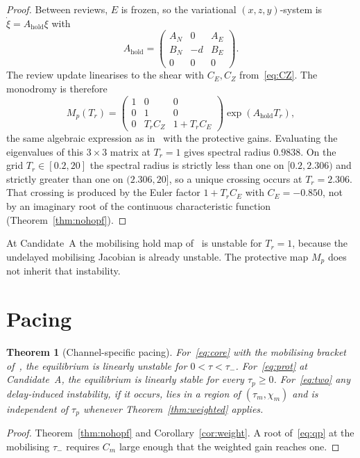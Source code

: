 \documentclass[11pt]{article}
\newtheorem{theorem}{Theorem}
\theoremstyle{definition}
\begin{document}
\begin{proof}
Between reviews, $E$ is frozen, so the variational $(x,z,y)$-system is $\dot\xi=A_{\mathrm{hold}}\xi$ with
\[
A_{\mathrm{hold}}=\begin{pmatrix}A_N&0&A_E\\ B_N&-d&B_E\\ 0&0&0\end{pmatrix}.
\]
The review update linearises to the shear with $C_E,C_Z$ from~\eqref{eq:CZ}. The monodromy is therefore
\[
M_p(T_r)=\begin{pmatrix}1&0&0\\0&1&0\\0&T_r C_Z&1+T_r C_E\end{pmatrix}\exp(A_{\mathrm{hold}}T_r),
\]
the same algebraic expression as in~\cite{paperI} with the protective gains. Evaluating the eigenvalues of this $3\times 3$ matrix at $T_r=1$ gives spectral radius $0.9838$. On the grid $T_r\in[0.2,20]$ the spectral radius is strictly less than one on $[0.2,2.306)$ and strictly greater than one on $(2.306,20]$, so a unique crossing occurs at $T_r=2.306$. That crossing is produced by the Euler factor $1+T_r C_E$ with $C_E=-0.850$, not by an imaginary root of the continuous characteristic function (Theorem~\ref{thm:nohopf}).
\end{proof}

At Candidate~A the mobilising hold map of~\cite{paperI} is unstable for $T_r=1$, because the undelayed mobilising Jacobian is already unstable. The protective map $M_p$ does not inherit that instability.

\section{Pacing}

\begin{theorem}[Channel-specific pacing]
\label{thm:policy}
For~\eqref{eq:core} with the mobilising bracket of~\cite{paperI}, the equilibrium is linearly unstable for $0<\tau<\tau_-$. For~\eqref{eq:prot} at Candidate~A, the equilibrium is linearly stable for every $\tau_p\ge 0$. For~\eqref{eq:two} any delay-induced instability, if it occurs, lies in a region of $(\tau_m,\chi_m)$ and is independent of $\tau_p$ whenever Theorem~\ref{thm:weighted} applies.
\end{theorem}

\begin{proof}
Theorem~\ref{thm:nohopf} and Corollary~\ref{cor:weight}. A root of~\eqref{eq:qp} at the mobilising $\tau_-$ requires $C_m$ large enough that the weighted gain reaches one.
\end{proof}
\end{document}

